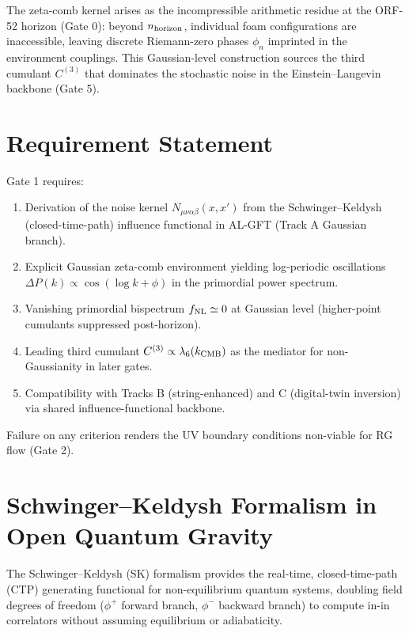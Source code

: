 \documentclass[11pt,a4paper,twoside]{article}
\begin{document}
The zeta-comb kernel arises as the incompressible arithmetic residue at the ORF-52 horizon (Gate 0): beyond $n_{\rm horizon}$, individual foam configurations are inaccessible, leaving discrete Riemann-zero phases $\phi_n$ imprinted in the environment couplings. This Gaussian-level construction sources the third cumulant $C^{(3)}$ that dominates the stochastic noise in the Einstein–Langevin backbone (Gate 5).

\section{Requirement Statement}
Gate 1 requires:
\begin{enumerate}
    \item Derivation of the noise kernel $N_{\mu\nu\alpha\beta}(x,x')$ from the Schwinger–Keldysh (closed-time-path) influence functional in AL-GFT (Track A Gaussian branch).
    \item Explicit Gaussian zeta-comb environment yielding log-periodic oscillations $\Delta P(k) \propto \cos(\log k + \phi)$ in the primordial power spectrum.
    \item Vanishing primordial bispectrum $f_{\rm NL} \simeq 0$ at Gaussian level (higher-point cumulants suppressed post-horizon).
    \item Leading third cumulant $C^{(3)} \propto \lambda_6(k_{\rm CMB})$ as the mediator for non-Gaussianity in later gates.
    \item Compatibility with Tracks B (string-enhanced) and C (digital-twin inversion) via shared influence-functional backbone.
\end{enumerate}
Failure on any criterion renders the UV boundary conditions non-viable for RG flow (Gate 2).

\section{Schwinger–Keldysh Formalism in Open Quantum Gravity}
The Schwinger–Keldysh (SK) formalism provides the real-time, closed-time-path (CTP) generating functional for non-equilibrium quantum systems, doubling field degrees of freedom ($\phi^+$ forward branch, $\phi^-$ backward branch) to compute in-in correlators without assuming equilibrium or adiabaticity.
\end{document}
